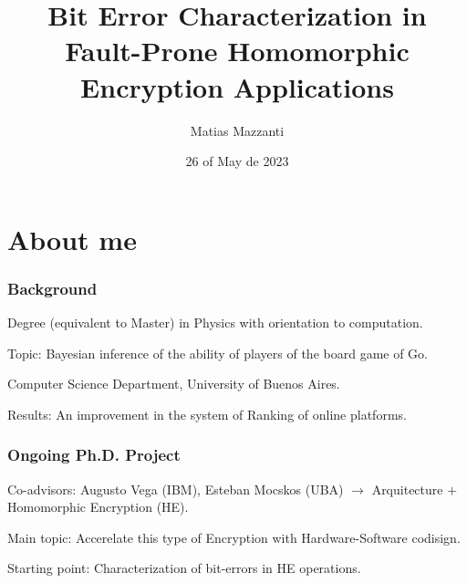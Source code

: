 \documentclass[10pt,handout]{beamer}
\title[]{Bit Error Characterization in Fault-Prone Homomorphic Encryption Applications}
\author[Matias Mazzanti]{Matias Mazzanti}
\institute{}
\date{26 of May de 2023}
\begin{document}
\begin{frame}

\maketitle

\end{frame}



\section{About me}
\begin{frame}
    \frametitle{Background}
    Degree (equivalent to Master) in Physics with orientation to computation.

    Topic: Bayesian inference of the ability of players of the board game of Go.

Computer Science Department, University of Buenos Aires.

Results: An improvement in the system of Ranking of online platforms.
\end{frame}

\begin{frame}
    \frametitle{Ongoing Ph.D. Project}
    Co-advisors:
    Augusto Vega (IBM), Esteban Mocskos (UBA) $\rightarrow$ Arquitecture $+$ Homomorphic Encryption (HE).

    Main topic: Accerelate this type of Encryption with Hardware-Software codisign.

    Starting point: Characterization of bit-errors in HE operations.
\end{frame}
\end{document}
